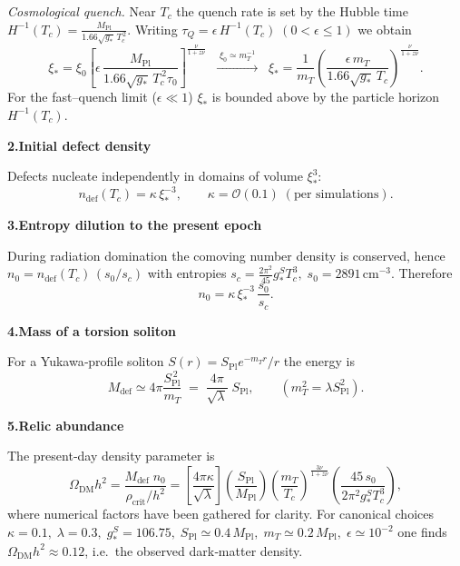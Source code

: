 \documentclass{article}
\newcommand{\Splanck}{S_{\mathrm{Pl}}}
\begin{document}
\medskip
\noindent
\emph{Cosmological quench.}  
Near \(T_c\) the quench rate is set by the Hubble time
\(H^{-1}(T_c)=\frac{M_{\text{Pl}}}{1.66\sqrt{g_*}\,T_c^{\,2}}\).
Writing \(\tau_Q=\epsilon\,H^{-1}(T_c)\;(0<\epsilon\le1)\) we obtain  
\[
\xi_*=\xi_0\left[\epsilon\,
\frac{M_{\text{Pl}}}{1.66\sqrt{g_*}\,T_c^{\,2}\tau_0}\right]^{\!\frac{\nu}{1+z\nu}}
\;\; \xrightarrow{\;\xi_0\simeq m_T^{-1}\;}
\;\;\xi_*=\frac{1}{m_T}\!
\left(\frac{\epsilon\,m_T}{1.66\sqrt{g_*}\,T_c}\right)^{\!\frac{\nu}{1+z\nu}}\!.
\]
For the fast--quench limit (\(\epsilon\!\ll\!1\)) \(\xi_*\) is bounded above by the particle horizon
\(H^{-1}(T_c)\).

\vspace{0.6em}
\noindent\textbf{2.\;Initial defect density}

Defects nucleate independently in domains of volume \(\xi_*^3\):
\[
n_{\text{def}}(T_c)=\kappa\,\xi_*^{-3},
\qquad
\kappa=\mathcal{O}(0.1)\;(\text{per simulations}).
\]

\vspace{0.6em}
\noindent\textbf{3.\;Entropy dilution to the present epoch}

During radiation domination the comoving number density is conserved, hence  
\(n_0 = n_{\text{def}}(T_c)\,(s_0/s_c)\) with entropies  
\(s_c=\tfrac{2\pi^2}{45}g_*^S T_c^{3},\; s_0=2891\,\text{cm}^{-3}\).
Therefore
\[
n_0 = \kappa\,\xi_*^{-3}\,
\frac{s_0}{s_c}.
\]

\vspace{0.6em}
\noindent\textbf{4.\;Mass of a torsion soliton}

For a Yukawa‑profile soliton  
\(S(r)=\Splanck e^{-m_T r}/r\) the energy is \cite[Eq.\,(5.1)]{GENESIS}
\[
M_{\text{def}}\simeq 4\pi\frac{\Splanck^{\,2}}{m_T}
        \;=\;\frac{4\pi}{\sqrt{\lambda}}\;\Splanck,
\qquad  (m_T^{2}=\lambda \Splanck^{2}).
\]

\vspace{0.6em}
\noindent\textbf{5.\;Relic abundance}

The present‐day density parameter is
\[
\Omega_{\text{DM}}h^{2}=
\frac{M_{\text{def}}\;n_0}{\rho_{\text{crit}}/h^{2}}
=
\left[\frac{4\pi\kappa}{\sqrt{\lambda}}\right]
\left(\frac{\Splanck}{M_{\text{Pl}}}\right)
\left(\frac{m_T}{T_c}\right)^{\!\frac{3\nu}{1+z\nu}}
\left(\frac{45\,s_0}{2\pi^{2}g_*^{S}T_c^{3}}\right)
\!,   \tag{H.1}
\]
where numerical factors have been gathered for clarity.
For canonical choices  
\(\kappa\!=\!0.1,\; \lambda\!=\!0.3,\;
g_*^{S}\!=\!106.75,\;
\Splanck\simeq0.4\,M_{\text{Pl}},\;
m_T\simeq0.2\,M_{\text{Pl}},\;
\epsilon\simeq10^{-2}\)
one finds  
\(\Omega_{\text{DM}}h^{2}\approx0.12\),
i.e.\ the observed dark‑matter density.
\end{document}
